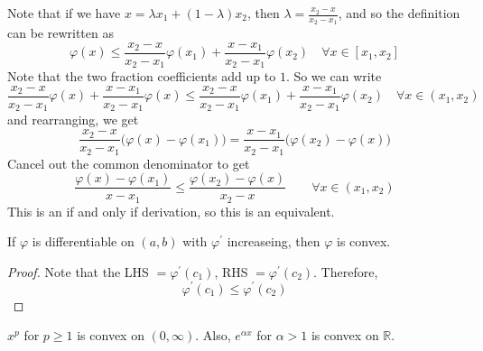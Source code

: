   Note that if we have $x = \lambda x_1 + (1 - \lambda) x_2$, then $\lambda = \frac{x_2 - x}{x_2 - x_1}$, and so the definition can be rewritten as 
  \begin{equation}
    \varphi(x) \leq \frac{x_2 - x}{x_2 - x_1} \varphi(x_1) + \frac{x - x_1}{x_2 - x_1} \varphi(x_2) \quad \forall x \in [x_1, x_2]
  \end{equation}
  Note that the two fraction coefficients add up to $1$. So we can write 
  \begin{equation}
    \frac{x_2 - x}{x_2 - x_1} \varphi(x) + \frac{x - x_1}{x_2 - x_1} \varphi(x)  \leq \frac{x_2 - x}{x_2 - x_1} \varphi(x_1) + \frac{x - x_1}{x_2 - x_1} \varphi(x_2) \quad \forall x \in (x_1, x_2)
  \end{equation}
  and rearranging, we get 
  \begin{equation}
    \frac{x_2 - x}{x_2 - x_1} \big( \varphi(x) - \varphi(x_1) \big) = \frac{x - x_1}{x_2 - x_1} \big( \varphi(x_2) - \varphi(x) \big)
  \end{equation} 
  Cancel out the common denominator to get 
  \begin{equation}
    \frac{\varphi(x) - \varphi(x_1)}{x - x_1} \leq \frac{\varphi(x_2) - \varphi(x)}{x_2 - x} \qquad \forall x \in (x_1, x_2)
  \end{equation}
  This is an if and only if derivation, so this is an equivalent. 

  \begin{theorem}
    If $\varphi$ is differentiable on $(a, b)$ with $\varphi^\prime$ increaseing, then $\varphi$ is convex. 
  \end{theorem}
  \begin{proof}
    Note that the LHS $= \varphi^\prime (c_1)$, RHS $= \varphi^\prime (c_2)$. Therefore, 
    \begin{equation}
      \varphi^\prime (c_1) \leq \varphi^\prime (c_2)
    \end{equation}
  \end{proof}

  \begin{example}
    $x^p$ for $p \geq 1$ is convex on $(0, \infty)$. Also, $e^{\alpha x}$ for $\alpha > 1$ is convex on $\mathbb{R}$. 
  \end{example}

